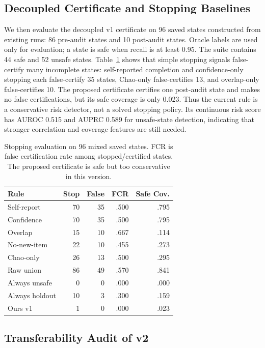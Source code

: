 \documentclass[letterpaper]{article}
\begin{document}
\subsection{Decoupled Certificate and Stopping Baselines}

We then evaluate the decoupled v1 certificate on 96 saved states constructed
from existing runs: 86 pre-audit states and 10 post-audit states. Oracle labels
are used only for evaluation; a state is safe when recall is at least 0.95. The
suite contains 44 safe and 52 unsafe states. Table~\ref{tab:v1-certificate}
shows that simple stopping signals false-certify many incomplete states:
self-reported completion and confidence-only stopping each false-certify 35
states, Chao-only false-certifies 13, and overlap-only false-certifies 10. The
proposed certificate certifies one post-audit state and makes no false
certifications, but its safe coverage is only 0.023. Thus the current rule is a
conservative risk detector, not a solved stopping policy. Its continuous risk
score has AUROC 0.515 and AUPRC 0.589 for unsafe-state detection, indicating
that stronger correlation and coverage features are still needed.

\begin{table}[H]
\centering
\small
\begin{tabular}{lrrrr}
\toprule
Rule & Stop & False & FCR & Safe Cov. \\
\midrule
Self-report & 70 & 35 & .500 & .795 \\
Confidence & 70 & 35 & .500 & .795 \\
Overlap & 15 & 10 & .667 & .114 \\
No-new-item & 22 & 10 & .455 & .273 \\
Chao-only & 26 & 13 & .500 & .295 \\
Raw union & 86 & 49 & .570 & .841 \\
Always unsafe & 0 & 0 & .000 & .000 \\
Always holdout & 10 & 3 & .300 & .159 \\
Ours v1 & 1 & 0 & .000 & .023 \\
\bottomrule
\end{tabular}
\caption{Stopping evaluation on 96 mixed saved states. FCR is false
certification rate among stopped/certified states. The proposed certificate is
safe but too conservative in this version.}
\label{tab:v1-certificate}
\end{table}

\subsection{Transferability Audit of v2}
\end{document}
